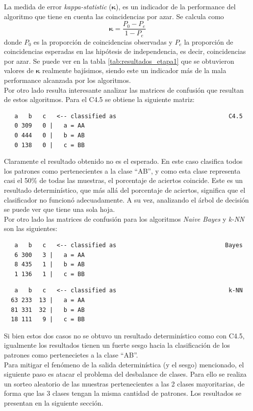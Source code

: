 \documentclass[12pt,a4paper,titlepage]{report}
\newcommand{\bs}{\boldsymbol}
\begin{document}
La medida de error \emph{kappa-statistic} ($\bs\kappa$), es un indicador de la performance del algoritmo que tiene en cuenta las coincidencias por azar. Se calcula como $$\bs\kappa = \frac{P_0-P_e}{1-P_e}$$donde $P_0$ es la proporción de coincidencias observadas y $P_e$ la proporción de coincidencias esperadas en las hipótesis de independencia, es decir, coincidencias por azar. Se puede ver en la tabla \ref{tab:resultados_etapa1} que se obtuvieron valores de $\bs\kappa$ realmente bajísimos, siendo este un indicador más de la mala performance alcanzada por los algoritmos.\\

Por otro lado resulta interesante analizar las matrices de confusión que resultan de estos algoritmos. Para el C4.5 se obtiene la siguiente matriz:
\begin{lstlisting}
   a   b   c   <-- classified as								C4.5
   0 309   0 |   a = AA
   0 444   0 |   b = AB
   0 138   0 |   c = BB
\end{lstlisting}
Claramente el resultado obtenido no es el esperado. En este caso clasifica todos los patrones como pertenecientes a la clase ``AB'', y como esta clase representa casi el 50\% de todas las muestras, el porcentaje de aciertos coincide. Este es un resultado determinístico, que más allá del porcentaje de aciertos, significa que el clasificador no funcionó adecuadamente. A su vez, analizando el árbol de decisión se puede ver que tiene una sola hoja.\\

Por otro lado las matrices de confusión para los algoritmos \emph{Naive Bayes} y \emph{k-NN} son las siguientes:
\begin{lstlisting}
   a   b   c   <-- classified as							   Bayes
   6 300   3 |   a = AA
   8 435   1 |   b = AB
   1 136   1 |   c = BB
\end{lstlisting}
\begin{lstlisting}
   a   b   c   <-- classified as								k-NN
  63 233  13 |   a = AA
  81 331  32 |   b = AB
  18 111   9 |   c = BB
\end{lstlisting}
Si bien estos dos casos no se obtuvo un resultado determinístico como con C4.5, igualmente los resultados tienen un fuerte sesgo hacia la clasificación de los patrones como pertenecietes a la clase ``AB''.\\

Para mitigar el fenómeno de la salida determinística (y el sesgo) mencionado, el siguiente paso es atacar el problema del desbalance de clases. Para ello se realiza un sorteo aleatorio de las muestras pertenecientes a las 2 clases mayoritarias, de forma que las 3 clases tengan la misma cantidad de patrones. Los resultados se presentan en la siguiente sección.
\end{document}
